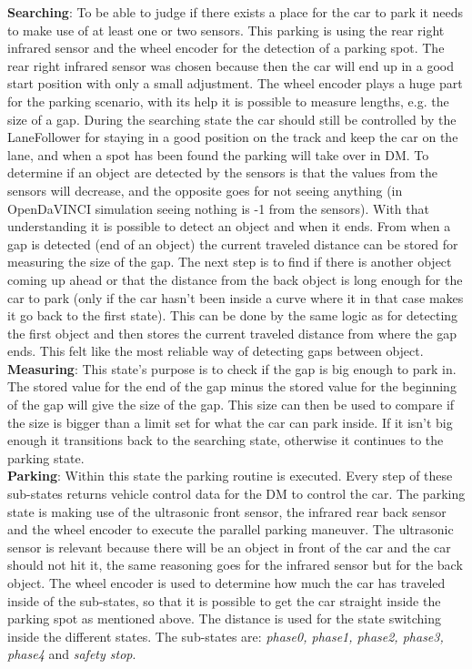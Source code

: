 \noindent
\textbf{Searching}: To be able to judge if there exists a place for the car to
park it needs to make use of at least one or two sensors. This parking is using
the rear right infrared sensor and the wheel encoder for the detection of a
parking spot. The rear right infrared sensor was chosen because then the car
will end up in a good start position with only a small adjustment. The wheel
encoder plays a huge part for the parking scenario, with its help it is possible
to measure lengths, e.g. the size of a gap. During the searching state the car
should still be controlled by the LaneFollower for staying in a good position on
the track and keep the car on the lane, and when a spot has been found the
parking will take over in DM. To determine if an object are detected by the
sensors is that the values from the sensors will decrease, and the opposite goes
for not seeing anything (in OpenDaVINCI simulation seeing nothing is -1 from the
sensors). With that understanding it is possible to detect an object and when it
ends. From when a gap is detected (end of an object) the current traveled
distance can be stored for measuring the size of the gap. The next step is to
find if there is another object coming up ahead or that the distance from the
back object is long enough for the car to park (only if the car hasn't been
inside a curve where it in that case makes it go back to the first state). This
can be done by the same logic as for detecting the first object and then stores
the current traveled distance from where the gap ends. This felt like the most
reliable way of detecting gaps between object.\\

\noindent
\textbf{Measuring}: This state's purpose is to check if the gap is big enough to
park in. The stored value for the end of the gap minus the stored value for the
beginning of the gap will give the size of the gap. This size can then be used
to compare if the size is bigger than a limit set for what the car can park
inside. If it isn't big enough it transitions back to the searching state,
otherwise it continues to the parking state.\\

\noindent
\textbf{Parking}: Within this state the parking routine is executed. Every step
of these sub-states returns vehicle control data for the DM to control the car.
The parking state is making use of the ultrasonic front sensor, the infrared
rear back sensor and the wheel encoder to execute the parallel parking maneuver.
The ultrasonic sensor is relevant because there will be an object in front of
the car and the car should not hit it, the same reasoning goes for the infrared
sensor but for the back object. The wheel encoder is used to determine how much
the car has traveled inside of the sub-states, so that it is possible to get the
car straight inside the parking spot as mentioned above. The distance is used
for the state switching inside the different states. The sub-states are:
\textit{phase0, phase1, phase2, phase3, phase4} and \textit{safety stop}.\\


